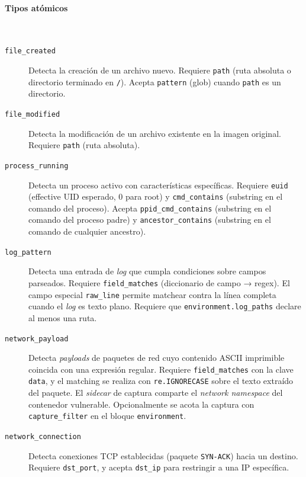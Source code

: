 \paragraph{Tipos atómicos}\mbox{}\\[0.0em]
\begin{description}
    \item[\texttt{file\_created}] Detecta la creación de un archivo nuevo.
    Requiere \texttt{path} (ruta absoluta o directorio terminado en \texttt{/}).
    Acepta \texttt{pattern} (glob) cuando \texttt{path} es un directorio.

    \item[\texttt{file\_modified}] Detecta la modificación de un archivo
    existente en la imagen original. Requiere \texttt{path} (ruta absoluta).

    \item[\texttt{process\_running}] Detecta un proceso activo con
    características específicas. Requiere \texttt{euid} (effective UID esperado,
    0 para root) y \texttt{cmd\_contains} (substring en el comando del proceso).
    Acepta \texttt{ppid\_cmd\_contains} (substring en el comando del proceso
    padre) y \texttt{ancestor\_contains} (substring en el comando de cualquier
    ancestro).

    \item[\texttt{log\_pattern}] Detecta una entrada de \textit{log} que cumpla
    condiciones sobre campos parseados. Requiere \texttt{field\_matches}
    (diccionario de campo → regex). El campo especial \texttt{raw\_line} permite
    matchear contra la línea completa cuando el \textit{log} es texto plano.
    Requiere que
    \texttt{environment.log\_paths} declare al menos una ruta.

    \item[\texttt{network\_payload}] Detecta \textit{payloads} de paquetes de
    red cuyo contenido ASCII imprimible coincida con una expresión regular.
    Requiere \texttt{field\_matches} con la clave \texttt{data}, y el matching
    se realiza
    con \texttt{re.IGNORECASE} sobre el texto extraído del paquete. El
    \textit{sidecar} de captura comparte el \textit{network namespace} del
    contenedor vulnerable. Opcionalmente se acota la captura con
    \texttt{capture\_filter} en el bloque \texttt{environment}.

    \item[\texttt{network\_connection}] Detecta conexiones TCP establecidas
    (paquete \texttt{SYN-ACK}) hacia un destino. Requiere \texttt{dst\_port}, y
    acepta \texttt{dst\_ip} para restringir a una IP específica.
\end{description}

